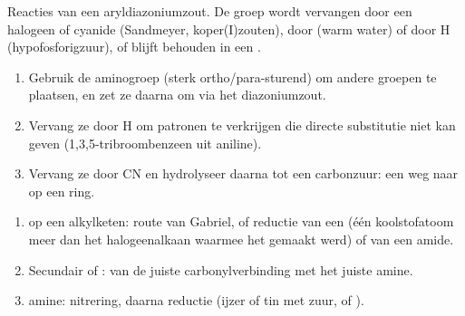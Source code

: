 \begin{omfigure}

{\small Reacties van een aryldiazoniumzout. De groep  wordt vervangen door een halogeen of
cyanide (Sandmeyer, koper(I)zouten), door  (warm water) of door H (hypofosforigzuur), of
blijft behouden in een .}
\end{omfigure}

\begin{method}\label{met:b2:amines:diazonium-routes}
\begin{enumerate}
  \item Gebruik de aminogroep (sterk ortho/para-sturend) om andere groepen te plaatsen, en zet ze daarna
        om via het diazoniumzout.
  \item Vervang ze door H om patronen te verkrijgen die directe substitutie niet kan geven
        (1,3,5-tribroombenzeen uit aniline).
  \item Vervang ze door CN en hydrolyseer daarna tot een carbonzuur: een weg naar  op een ring.
\end{enumerate}
\end{method}

\begin{method}\label{met:b2:amines:make-amine}
\begin{enumerate}
  \item {} op een alkylketen: route van Gabriel, of reductie van een  (één koolstofatoom
        meer dan het halogeenalkaan waarmee het gemaakt werd) of van een amide.
  \item Secundair of :  van de juiste carbonylverbinding met
        het juiste amine.
  \item {} amine: nitrering, daarna reductie (ijzer of tin met zuur, of ).
\end{enumerate}
\end{method}

